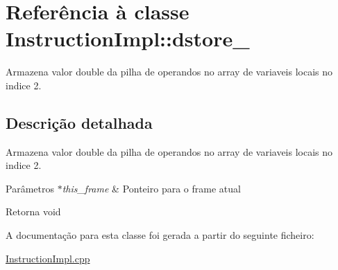 \hypertarget{class_instruction_impl_1_1dstore__2}{}\section{Referência à classe Instruction\+Impl\+:\+:dstore\+\_}
\label{class_instruction_impl_1_1dstore__2}


Armazena valor double da pilha de operandos no array de variaveis locais no indice 2.  




\subsection{Descrição detalhada}
Armazena valor double da pilha de operandos no array de variaveis locais no indice 2. 


\begin{DoxyParams}{Parâmetros}
{\em $\ast$this\+\_\+frame} & Ponteiro para o frame atual \\
\hline
\end{DoxyParams}
\begin{DoxyReturn}{Retorna}
void 
\end{DoxyReturn}


A documentação para esta classe foi gerada a partir do seguinte ficheiro\+:\begin{DoxyCompactItemize}
\item 
\hyperlink{_instruction_impl_8cpp}{Instruction\+Impl.\+cpp}\end{DoxyCompactItemize}
